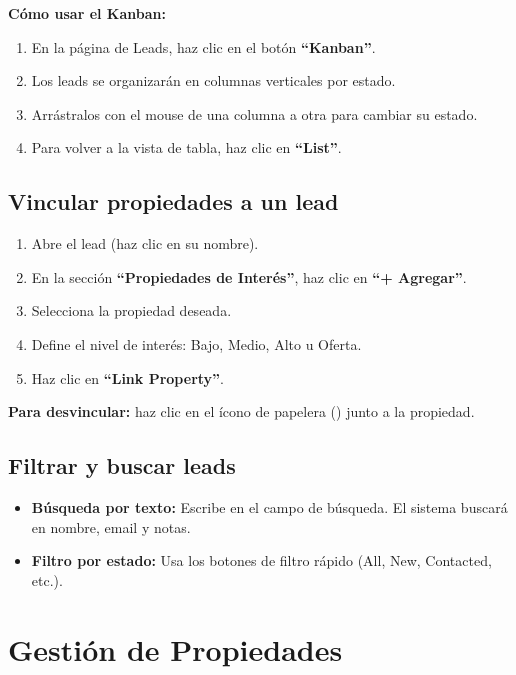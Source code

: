 \documentclass[12pt,oneside]{article}
\begin{document}
\noindent\textbf{Cómo usar el Kanban:}
\begin{enumerate}[leftmargin=*]
  \item En la página de Leads, haz clic en el botón \textbf{“Kanban”}.
  \item Los leads se organizarán en columnas verticales por estado.
  \item Arrástralos con el mouse de una columna a otra para cambiar su estado.
  \item Para volver a la vista de tabla, haz clic en \textbf{“List”}.
\end{enumerate}

\subsection{Vincular propiedades a un lead}

\begin{enumerate}[leftmargin=*]
  \item Abre el lead (haz clic en su nombre).
  \item En la sección \textbf{“Propiedades de Interés”}, haz clic en \textbf{“+ Agregar”}.
  \item Selecciona la propiedad deseada.
  \item Define el nivel de interés: Bajo, Medio, Alto u Oferta.
  \item Haz clic en \textbf{“Link Property”}.
\end{enumerate}

\noindent\textbf{Para desvincular:} haz clic en el ícono de papelera (\faTrash) junto a la propiedad.

\subsection{Filtrar y buscar leads}

\begin{itemize}[leftmargin=*]
  \item \textbf{Búsqueda por texto:} Escribe en el campo de búsqueda. El sistema buscará en nombre, email y notas.
  \item \textbf{Filtro por estado:} Usa los botones de filtro rápido (All, New, Contacted, etc.).
\end{itemize}

\section{Gestión de Propiedades}
\end{document}
